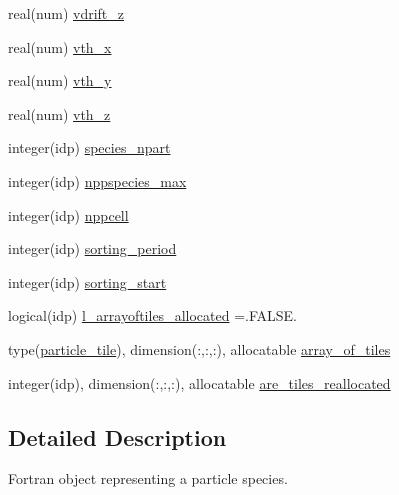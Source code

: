 \begin{DoxyCompactItemize}
\item 
real(num) \hyperlink{structparticle__speciesmodule_1_1particle__species_abe947e62e9f02647421983bab36fd3b4}{vdrift\+\_\+z}
\item 
real(num) \hyperlink{structparticle__speciesmodule_1_1particle__species_a0aac3d8c006510865b01a1c92f12518d}{vth\+\_\+x}
\item 
real(num) \hyperlink{structparticle__speciesmodule_1_1particle__species_a24a2e879d8fabf97d081e857e2307781}{vth\+\_\+y}
\item 
real(num) \hyperlink{structparticle__speciesmodule_1_1particle__species_aaa81b5d65f657ac14030dc1b173f2c3f}{vth\+\_\+z}
\item 
integer(idp) \hyperlink{structparticle__speciesmodule_1_1particle__species_a76ebc6a561029fa9850569bde01428be}{species\+\_\+npart}
\item 
integer(idp) \hyperlink{structparticle__speciesmodule_1_1particle__species_ae60b4ef189f4777fcbd38c8fa083b6a5}{nppspecies\+\_\+max}
\item 
integer(idp) \hyperlink{structparticle__speciesmodule_1_1particle__species_a85d9fbe02cbe094dd5d45b29e5a5cb52}{nppcell}
\item 
integer(idp) \hyperlink{structparticle__speciesmodule_1_1particle__species_a4bb668ad609f86bc2e0832a79d262f76}{sorting\+\_\+period}
\item 
integer(idp) \hyperlink{structparticle__speciesmodule_1_1particle__species_a28962e064910019368a651104e5104c1}{sorting\+\_\+start}
\item 
logical(idp) \hyperlink{structparticle__speciesmodule_1_1particle__species_a7ba3dd839d9ff39e9c2a8b7151d93e3c}{l\+\_\+arrayoftiles\+\_\+allocated} =.F\+A\+L\+S\+E.
\item 
type(\hyperlink{structparticle__tilemodule_1_1particle__tile}{particle\+\_\+tile}), dimension(\+:,\+:,\+:), allocatable \hyperlink{structparticle__speciesmodule_1_1particle__species_adf3862efae3787dab97df9f9064b65d9}{array\+\_\+of\+\_\+tiles}
\item 
integer(idp), dimension(\+:,\+:,\+:), allocatable \hyperlink{structparticle__speciesmodule_1_1particle__species_acfd22fe918c6c278d3e6cd7d4ae1d6f9}{are\+\_\+tiles\+\_\+reallocated}
\end{DoxyCompactItemize}


\subsection{Detailed Description}
Fortran object representing a particle species. 

